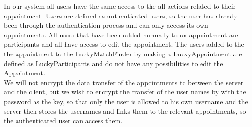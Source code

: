 In our system all users have the same access to the all actions related to their appointment. Users are defined as authenticated users, so the user has already been through the authentication process and can only access its own appointments. All users that have been added normally to an appointment are participants and all have access to edit the appointment. The users added to the the appointment to the LuckyMatchFinder by making a LuckyAppointment are defined as LuckyParticipants and do not have any possibilities to edit the Appointment.\\

We will not encrypt the data transfer of the appointments to between the server and the client, but we wish to encrypt the transfer of the user names by with the password as the key, so that only the user is allowed to his own username and the server then stores the usernames and links them to the relevant appointments, so the authenticated user can access them. \\